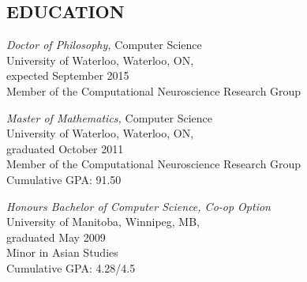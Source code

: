 \documentclass[line,margin]{res}
\begin{document}
\address{31 Mulberry Ln, Waterloo, ON}
\address{tbekolay@gmail.com $\cdot$ (519) 573-4815}

\begin{resume}

\section{EDUCATION}

{\sl Doctor of Philosophy,} Computer Science \\
University of Waterloo, Waterloo, ON, \\
expected September 2015 \\
Member of the Computational Neuroscience Research Group

{\sl Master of Mathematics,} Computer Science \\
University of Waterloo, Waterloo, ON, \\
graduated October 2011 \\
Member of the Computational Neuroscience Research Group \\
Cumulative GPA: 91.50
  
{\sl Honours Bachelor of Computer Science, Co-op Option} \\
University of Manitoba, Winnipeg, MB, \\
graduated May 2009 \\
Minor in Asian Studies \\
Cumulative GPA: 4.28/4.5


\end{resume}
\end{document}
